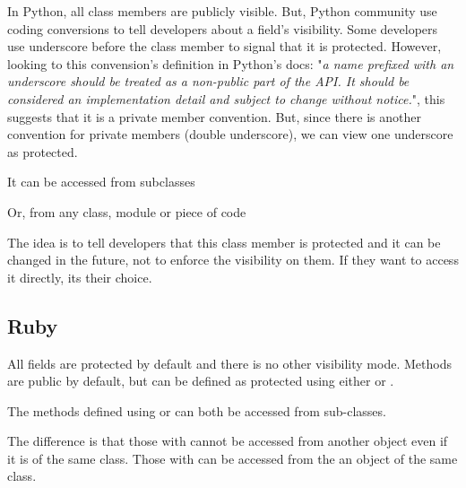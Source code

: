 \documentclass{KodeBook}
\begin{document}
In Python, all class members are publicly visible. 
But, Python community use coding conversions to tell developers about a field's visibility. 
Some developers use underscore \keyword{\_} before the class member to signal that it is protected. 
However, looking to this convension's definition in Python's docs: "\textit{a name prefixed with an underscore should be treated as a non-public part of the API. It should be considered an implementation detail and subject to change without notice.}", this suggests that it is a private member convention.
But, since there is another convention for private members (double underscore), we can view one underscore as protected.



It can be accessed from subclasses



Or, from any class, module or piece of code 



The idea is to tell developers that this class member is protected and it can be changed in the future, not to enforce the visibility on them. 
If they want to access it directly, its their choice.

\subsection{Ruby}

All fields are protected by default and there is no other visibility mode. 
Methods are public by default, but can be defined as protected using either  or . 



The methods defined using  or  can both be accessed from sub-classes.



The difference is that those with  cannot be accessed from another object even if it is of the same class. 
Those with  can be accessed from the an object of the same class.
\end{document}
